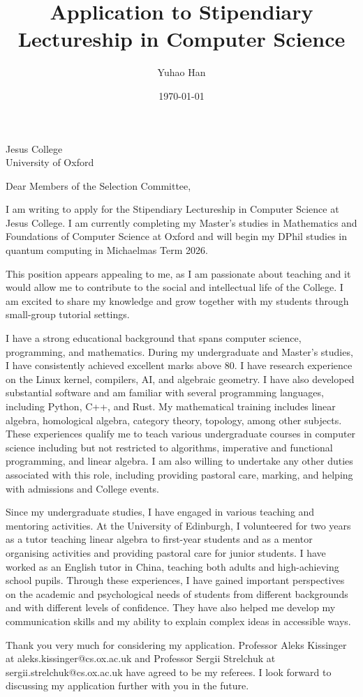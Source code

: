 \documentclass{letter}
\title{Application to Stipendiary Lectureship in Computer Science}
\author{Yuhao Han}
\date{\today}
\begin{document}

\begin{letter}{Jesus College \\ University of Oxford}
\opening{Dear Members of the Selection Committee,}

I am writing to apply for the Stipendiary Lectureship in Computer Science at Jesus College.
I am currently completing my Master's studies in Mathematics and Foundations of Computer Science at Oxford and will begin my DPhil studies in quantum computing in Michaelmas Term 2026.

This position appears appealing to me, as I am passionate about teaching and it would allow me to contribute to the social and intellectual life of the College. 
I am excited to share my knowledge and grow together with my students through small-group tutorial settings.

I have a strong educational background that spans computer science, programming, and mathematics.
During my undergraduate and Master's studies, I have consistently achieved excellent marks above 80.
I have research experience on the Linux kernel, compilers, AI, and algebraic geometry. 
I have also developed substantial software and am familiar with several programming languages, including Python, C++, and Rust.
My mathematical training includes linear algebra, homological algebra, category theory, topology, among other subjects.
These experiences qualify me to teach various undergraduate courses in computer science including but not restricted to algorithms, imperative and functional programming, and linear algebra. I am also willing to undertake any other duties associated with this role, including providing pastoral care, marking, and helping with admissions and College events.

Since my undergraduate studies, I have engaged in various teaching and mentoring activities. 
At the University of Edinburgh, I volunteered for two years as a tutor teaching linear algebra to first-year students and as a mentor organising activities and providing pastoral care for junior students.
I have worked as an English tutor in China, teaching both adults and high-achieving school pupils.
Through these experiences, I have gained important perspectives on the academic and psychological needs of students from different backgrounds and with different levels of confidence.
They have also helped me develop my communication skills and my ability to explain complex ideas in accessible ways.

Thank you very much for considering my application.
Professor Aleks Kissinger at aleks.kissinger@cs.ox.ac.uk and Professor Sergii Strelchuk at sergii.strelchuk@cs.ox.ac.uk have agreed to be my referees.
I look forward to discussing my application further with you in the future.


\end{letter}
\end{document}
